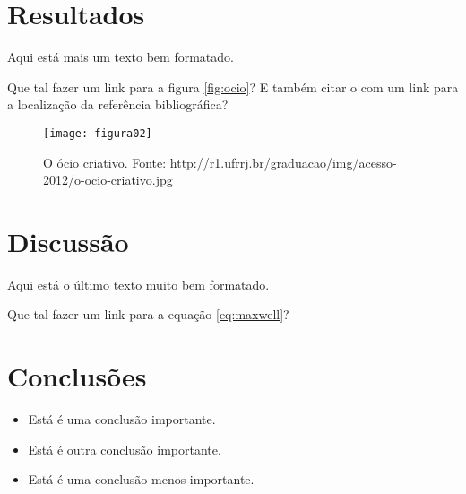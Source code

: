 \section{Resultados}

Aqui está mais um texto bem formatado. \blindtext[1]

Que tal fazer um link para a figura \autoref{fig:ocio}? E também citar o  com um 
link para a localização da referência bibliográfica?

\begin{figure}[!ht]
\centering
\texttt{[image: figura02]}
\caption{\label{fig:ocio}O ócio criativo. Fonte: \url{http://r1.ufrrj.br/graduacao/img/acesso-2012/o-ocio-criativo.jpg}}
\end{figure}

\section{Discussão}

Aqui está o último texto muito bem formatado. \blindtext[2]

Que tal fazer um link para a equação \autoref{eq:maxwell}?

\section{Conclusões}

\begin{itemize}
  \item Está é uma conclusão importante.
  \item Está é outra conclusão importante.
  \item Está é uma conclusão menos importante.
\end{itemize}
